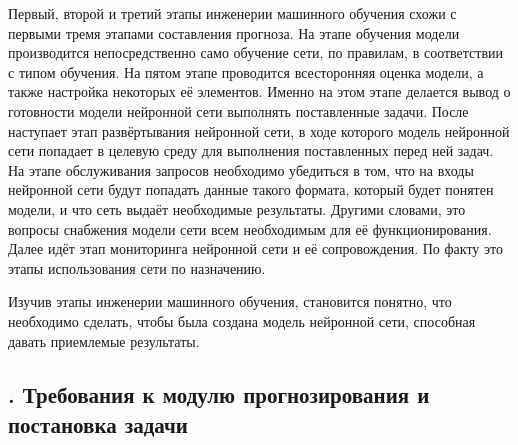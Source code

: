 {  \par \redline Первый, второй и третий этапы инженерии машинного обучения схожи с первыми тремя этапами составления прогноза. На этапе обучения модели производится непосредственно само обучение сети, по правилам, в соответствии с типом обучения. На пятом этапе проводится всесторонняя оценка модели, а также настройка некоторых её элементов. Именно на этом этапе делается вывод о готовности модели нейронной сети выполнять поставленные задачи. После наступает этап развёртывания нейронной сети, в ходе которого модель нейронной сети попадает в целевую среду для выполнения поставленных перед ней задач. На этапе обслуживания запросов необходимо убедиться в том, что на входы нейронной сети будут попадать данные такого формата, который будет понятен модели, и что сеть выдаёт необходимые результаты. Другими словами, это вопросы снабжения модели сети всем необходимым для её функционирования. Далее идёт этап мониторинга нейронной сети и её сопровождения. По факту это этапы использования сети по назначению.

  \par \redline Изучив этапы инженерии машинного обучения, становится понятно, что необходимо сделать, чтобы была создана модель нейронной сети, способная давать приемлемые результаты.

  \par
}

\subtitlespace

\subsection*{
  \gostTitleFont
  \redline
  \thechaptercntr .\thesubchaptercntr \spc
  Требования к модулю прогнозирования и постановка задачи
} \addtocounter{subchaptercntr}{1}

\subtitlespace

